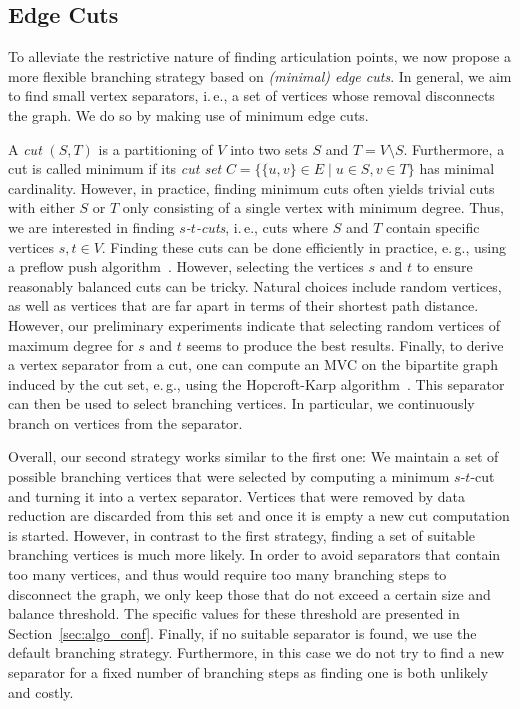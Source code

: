 \documentclass[a4paper,UKenglish,cleveref, autoref, thm-restate]{lipics-v2021}
\newcommand{\ie}{i.\,e.,\xspace}
\newcommand{\eg}{e.\,g.,\xspace}
\begin{document}
\subsection{Edge Cuts}
To alleviate the restrictive nature of finding articulation points, we now propose a more flexible branching strategy based on \emph{(minimal) edge cuts}.
In general, we aim to find small vertex separators, \ie a set of vertices whose removal disconnects the graph.
We do so by making use of minimum edge cuts.

A \emph{cut} $(S,T)$ is a partitioning of $V$ into two sets $S$ and $T=V\setminus S$.
Furthermore, a cut is called minimum if its \emph{cut set} $C = \{\{u,v\} \in E \mid u \in S, v \in T\}$ has minimal cardinality.
However, in practice, finding minimum cuts often yields trivial cuts with either $S$ or $T$ only consisting of a single vertex with minimum degree. 
Thus, we are interested in finding \emph{$s$-$t$-cuts}, \ie cuts where $S$ and $T$ contain specific vertices $s,t \in V$.
Finding these cuts can be done efficiently in practice, \eg using a preflow push algorithm~\cite{goldberg1988new}.
However, selecting the vertices $s$ and $t$ to ensure reasonably balanced cuts can be tricky.
Natural choices include random vertices, as well as vertices that are far apart in terms of their shortest path distance.
However, our preliminary experiments indicate that selecting random vertices of maximum degree
 for $s$ and $t$ seems to produce the best results.
Finally, to derive a vertex separator from a cut, one can compute an MVC on the bipartite graph induced by the cut set, \eg using the Hopcroft-Karp algorithm~\cite{hopcroft1973n}.
This separator can then be used to select branching vertices. In particular,
we continuously branch on vertices from the separator.

Overall, our second strategy works similar to the first one: We maintain a set of possible branching vertices that were selected by computing a minimum $s$-$t$-cut and turning it into a vertex separator.
Vertices that were removed by data reduction are discarded from this set and once it is empty a new cut computation is started.
However, in contrast to the first strategy, finding a set of suitable branching vertices is much more likely.
In order to avoid separators that contain too many vertices, and thus would require too many branching steps to disconnect the graph, we only keep those that do not exceed a certain size and balance threshold.
The specific values for these threshold are presented in Section~\ref{sec:algo_conf}.
Finally, if no suitable separator is found, we use the default branching strategy.
Furthermore, in this case we do not try to find a new separator for a fixed number of branching steps as finding one is both unlikely and costly.
\end{document}

